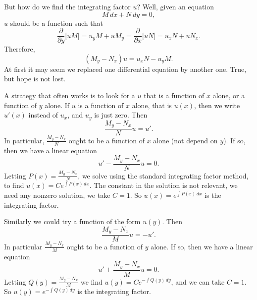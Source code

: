 \documentclass[12pt]{book}
\begin{document}
But how do we find the integrating factor $u$?  Well, given an equation
\begin{equation*}
M \, dx + N \, dy = 0 ,
\end{equation*}
$u$ should be a
function such that
\begin{equation*}
\frac{\partial}{\partial y} \bigl[ u M \bigr] = 
u_y M + u M_y = 
\frac{\partial}{\partial x} \bigl[ u N \bigr] = 
u_x N + u N_x .
\end{equation*}
Therefore,
\begin{equation*}
(M_y-N_x)u = u_x N - u_y M .
\end{equation*}
At first it may seem we replaced one differential equation by another
one.  True, but hope is not lost.

A strategy that often works is to look for a $u$ that is a function
of $x$ alone, or a function of $y$ alone.  If $u$ is a function of $x$
alone,
that is $u(x)$, then we write $u'(x)$ instead of $u_x$, and $u_y$ is just
zero.
Then
\begin{equation*}
\frac{M_y-N_x}{N}u = u' .
\end{equation*}
In particular, $\frac{M_y-N_x}{N}$ ought to be a function of $x$ alone (not
depend on $y$).  If so, then we have a linear equation
\begin{equation*}
u' - \frac{M_y-N_x}{N} u = 0 .
\end{equation*}
Letting $P(x) = \frac{M_y-N_x}{N}$,
we solve using the standard integrating factor method,
to find $u(x) = C e^{\int P(x) \, dx}$.  The constant in the
solution is not relevant, we need any nonzero solution,
we take $C=1$.
So $u(x) = e^{\int P(x) \, dx}$ is the integrating factor.

Similarly we could try a function of the form $u(y)$.
Then
\begin{equation*}
\frac{M_y-N_x}{M} u = - u' .
\end{equation*}
In particular $\frac{M_y-N_x}{M}$ ought to be a function of $y$ alone.
If so, then we have a linear equation
\begin{equation*}
u' + \frac{M_y-N_x}{M} u = 0 .
\end{equation*}
Letting $Q(y) = \frac{M_y-N_x}{M}$
we find $u(y) = C e^{-\int Q(y) \, dy}$, and we can
take $C=1$.  So $u(y) = e^{-\int Q(y) \, dy}$ is the integrating factor.
\end{document}
